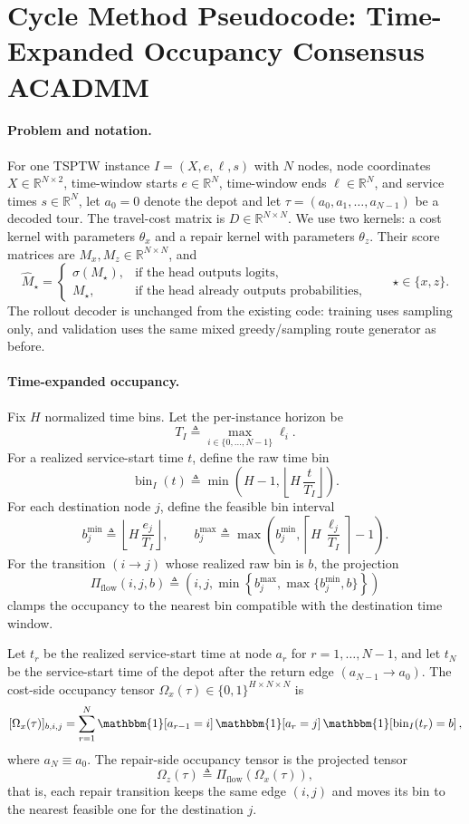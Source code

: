 \section{Cycle Method Pseudocode: Time-Expanded Occupancy Consensus ACADMM}

\paragraph{Problem and notation.}
For one TSPTW instance $I=(X,e,\ell,s)$ with $N$ nodes, node coordinates $X\in\mathbb{R}^{N\times 2}$, time-window starts $e\in\mathbb{R}^N$, time-window ends $\ell\in\mathbb{R}^N$, and service times $s\in\mathbb{R}^N$, let $a_0=0$ denote the depot and let $\tau=(a_0,a_1,\ldots,a_{N-1})$ be a decoded tour. The travel-cost matrix is $D\in\mathbb{R}^{N\times N}$. We use two kernels: a cost kernel with parameters $\theta_x$ and a repair kernel with parameters $\theta_z$. Their score matrices are $M_x,M_z\in\mathbb{R}^{N\times N}$, and
\[
\widehat M_\star =
\begin{cases}
\sigma(M_\star), & \text{if the head outputs logits},\\
M_\star, & \text{if the head already outputs probabilities},
\end{cases}
\qquad \star\in\{x,z\}.
\]
The rollout decoder is unchanged from the existing code: training uses sampling only, and validation uses the same mixed greedy/sampling route generator as before.

\paragraph{Time-expanded occupancy.}
Fix $H$ normalized time bins. Let the per-instance horizon be
\[
T_I \triangleq \max_{i\in\{0,\ldots,N-1\}} \ell_i .
\]
For a realized service-start time $t$, define the raw time bin
\[
\operatorname{bin}_I(t) \triangleq \min\!\left(H-1,\left\lfloor H\,\frac{t}{T_I}\right\rfloor\right).
\]
For each destination node $j$, define the feasible bin interval
\[
b_j^{\min} \triangleq \left\lfloor H\,\frac{e_j}{T_I}\right\rfloor,\qquad
b_j^{\max} \triangleq \max\!\left(b_j^{\min},\left\lceil H\,\frac{\ell_j}{T_I}\right\rceil-1\right).
\]
For the transition $(i\!\to\! j)$ whose realized raw bin is $b$, the projection
\[
\Pi_{\mathrm{flow}}(i,j,b) \triangleq \left(i,j,\min\!\left\{b_j^{\max},\max\{b_j^{\min},b\}\right\}\right)
\]
clamps the occupancy to the nearest bin compatible with the destination time window.

Let $t_r$ be the realized service-start time at node $a_r$ for $r=1,\ldots,N-1$, and let $t_N$ be the service-start time of the depot after the return edge $(a_{N-1}\!\to\! a_0)$. The cost-side occupancy tensor $\Omega_x(\tau)\in\{0,1\}^{H\times N\times N}$ is
\[
[\Omega_x(\tau)]_{b,i,j}
=
\sum_{r=1}^{N}
\mathbbm{1}[a_{r-1}=i]\,
\mathbbm{1}[a_r=j]\,
\mathbbm{1}\!\left[\operatorname{bin}_I(t_r)=b\right],
\]
where $a_N\equiv a_0$. The repair-side occupancy tensor is the projected tensor
\[
\Omega_z(\tau) \triangleq \Pi_{\mathrm{flow}}\!\left(\Omega_x(\tau)\right),
\]
that is, each repair transition keeps the same edge $(i,j)$ and moves its bin to the nearest feasible one for the destination $j$.

